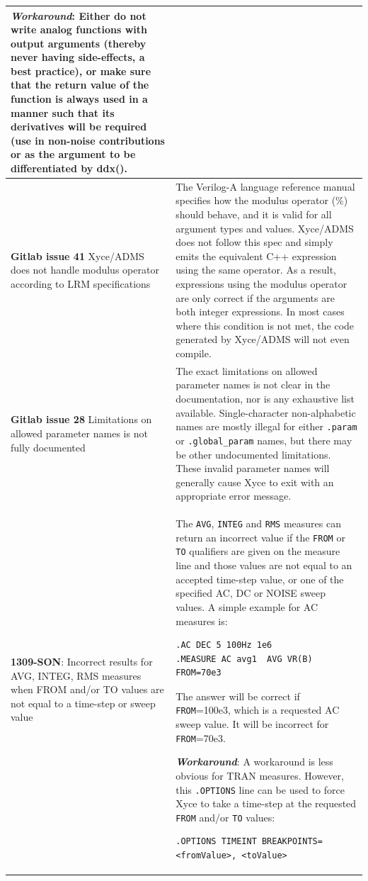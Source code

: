 {\begin{longtable}[h] {>{\raggedright\small}m{2in}|>{\raggedright\let\\\tabularnewline\small}m{3.5in}}
\textbf{\textit{Workaround}}:
Either do not write analog functions with output arguments (thereby
never having side-effects, a best practice), or make sure that the
return value of the function is always used in a manner such that its
derivatives will be required (use in non-noise contributions or as
the argument to be differentiated by ddx().

\\ \hline
\textbf{Gitlab issue 41} Xyce/ADMS does not handle modulus operator according to LRM specifications &
The Verilog-A language reference manual specifies how the modulus
operator (\%) should behave, and it is valid for all argument types
and values.  Xyce/ADMS does not follow this spec and simply emits the
equivalent C++ expression using the same operator.  As a result,
expressions using the modulus operator are only correct if the
arguments are both integer expressions.  In most cases where this
condition is not met, the code generated by Xyce/ADMS will not even
compile.  \\ \hline

\textbf{Gitlab issue 28} Limitations on allowed parameter names is not fully documented &
The exact limitations on allowed parameter names is not clear in the
documentation, nor is any exhaustive list available.  Single-character
non-alphabetic names are mostly illegal for either \texttt{.param}
or \texttt{.global\_param} names, but there may be other undocumented
limitations.  These invalid parameter names will generally cause Xyce
to exit with an appropriate error message.  \\ \hline

\textbf{1309-SON}: Incorrect results for AVG, INTEG, RMS measures when FROM
and/or TO values are not equal to a time-step or sweep value & The \texttt{AVG},
\texttt{INTEG} and \texttt{RMS} measures can return an incorrect value if
the \texttt{FROM} or \texttt{TO} qualifiers are given on the measure line
and those values are not equal to an accepted time-step value, or one of
the specified AC, DC or NOISE sweep values.  A simple example for AC measures
is:
\begin{verbatim}
.AC DEC 5 100Hz 1e6
.MEASURE AC avg1  AVG VR(B) FROM=70e3
\end{verbatim}
The answer will be correct if \texttt{FROM}=100e3, which is a requested
AC sweep value. It will be incorrect for \texttt{FROM}=70e3.

\textbf{\textit{Workaround}}:
A workaround is less obvious for TRAN measures.  However, this \texttt{.OPTIONS}
line can be used to force Xyce to take a time-step at the requested \texttt{FROM}
and/or \texttt{TO} values:
\begin{verbatim}
.OPTIONS TIMEINT BREAKPOINTS=<fromValue>, <toValue>
\end{verbatim}
\\ \hline


\end{longtable}}
